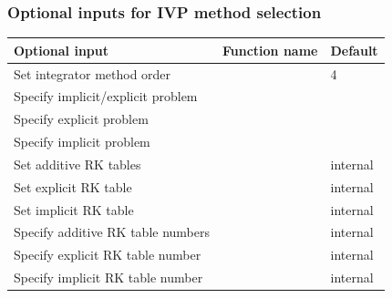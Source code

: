 \documentclass[letterpaper,10pt,english]{sphinxmanual}
\begin{document}
\subsubsection{Optional inputs for IVP method selection}
\label{c_interface/User_callable:optional-inputs-for-ivp-method-selection}\label{c_interface/User_callable:cinterface-arkodemethodinputtable}
\begin{tabulary}{\linewidth}{|L|L|L|}
\hline
\textsf{\relax 
Optional input
} & \textsf{\relax 
Function name
} & \textsf{\relax 
Default
}\\
\hline
Set integrator method order
 & 
{\hyperref[c_interface/User_callable:c.ARKodeSetOrder]{\emph{}}}
 & 
4
\\
\hline
Specify implicit/explicit problem
 & 
{\hyperref[c_interface/User_callable:c.ARKodeSetImEx]{\emph{}}}
 & 
\\
\hline
Specify explicit problem
 & 
{\hyperref[c_interface/User_callable:c.ARKodeSetExplicit]{\emph{}}}
 & 
\\
\hline
Specify implicit problem
 & 
{\hyperref[c_interface/User_callable:c.ARKodeSetImplicit]{\emph{}}}
 & 
\\
\hline
Set additive RK tables
 & 
{\hyperref[c_interface/User_callable:c.ARKodeSetARKTables]{\emph{}}}
 & 
internal
\\
\hline
Set explicit RK table
 & 
{\hyperref[c_interface/User_callable:c.ARKodeSetERKTable]{\emph{}}}
 & 
internal
\\
\hline
Set implicit RK table
 & 
{\hyperref[c_interface/User_callable:c.ARKodeSetIRKTable]{\emph{}}}
 & 
internal
\\
\hline
Specify additive RK table numbers
 & 
{\hyperref[c_interface/User_callable:c.ARKodeSetARKTableNum]{\emph{}}}
 & 
internal
\\
\hline
Specify explicit RK table number
 & 
{\hyperref[c_interface/User_callable:c.ARKodeSetERKTableNum]{\emph{}}}
 & 
internal
\\
\hline
Specify implicit RK table number
 & 
{\hyperref[c_interface/User_callable:c.ARKodeSetIRKTableNum]{\emph{}}}
 & 
internal
\\
\hline\end{tabulary}

\end{document}

